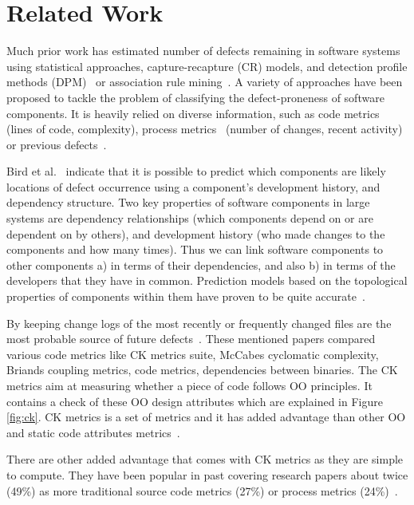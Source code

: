 \documentclass[sigconf,review, anonymous]{acmart}
\theoremstyle{break}
\begin{document}
\section{Related Work}
\label{sect:review}

Much prior work has estimated number of defects remaining in software systems~\cite{hall2012systematic} using statistical approaches, capture-recapture 
(CR) models, and detection profile methods (DPM)~\cite{song2011general} or
association rule mining~\cite{song2006software}. A variety of approaches have been proposed to tackle the problem of classifying the defect-proneness of software components. It is heavily relied on diverse information, such as code metrics~\cite{d2010extensive,menzies2007data, nagappan2006mining,shepperd2014researcher,Menzies2010} (lines of code, complexity), process metrics~\cite{hassan2009predicting} (number of changes, recent activity) or previous defects~\cite{kim2007predicting}.

Bird et al.~\cite{bird2009putting} indicate that it is possible to predict which components are likely locations of
defect occurrence using a component's development history,
and dependency structure. Two key properties of software components
in large systems are dependency relationships (which components
depend on or are dependent on by others), and development
history (who made changes to the components and
how many times). Thus we can link software components
to other components a) in terms of their dependencies, and
also b) in terms of the developers that they have in common. Prediction models based on the topological properties
of components within them have proven to be quite
accurate~\cite{zimmermann2008predicting}.

By keeping change logs of the most recently or frequently changed files are the most probable source of future defects~\cite{hall2012systematic, catal2009systematic}. These mentioned papers compared various code metrics like CK  metrics  suite,  
McCabes  cyclomatic  complexity, Briands coupling metrics, code metrics, 
dependencies between  binaries. The CK metrics aim at measuring whether a 
piece of code follows OO principles. It contains a check of these OO design 
attributes which are explained in Figure \ref{fig:ck}. CK metrics is a set
of metrics and it has added advantage than other OO and static code attributes metrics~\cite{d2010extensive}. 

There are other added advantage that comes with CK metrics as they are  simple  to  compute. They have been popular in past covering research papers about twice (49\%) 
as more traditional source code metrics (27\%) or process metrics (24\%)~\cite{radjenovic2013software}. 
\end{document}
